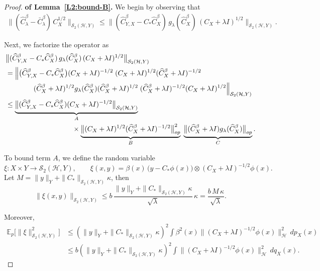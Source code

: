 \documentclass[twoside,11pt]{article}
\begin{document}
\begin{proof}\textbf{of Lemma~\ref{L2:bound-B}.}
We begin by observing that
\begin{align*}
\bigl\| ( \widehat{C}_\lambda^\beta-\bar{C}_{\lambda}^\beta)\, C_X^{1/2} \bigr\|_{\mathcal  S_2(\mathcal H,Y)}
\leq
\bigl\|
( \widehat{C}_{Y,X}^\beta-{C_*}\widehat C_X^\beta)\,
g_\lambda(\widehat{C}_X^\beta)\,
(C_{X}+\lambda I)^{1/2}
\bigr\|_{\mathcal S_2(\mathcal H,Y)} .
\end{align*}

\noindent
Next, we factorize the operator as
\begin{align*}
&\bigl\|
(\widehat{C}_{Y,X}^\beta - C_* \widehat{C}_X^\beta)\,
g_\lambda(\widehat{C}_X^\beta)\,
(C_X+\lambda I)^{1/2}
\bigr\|_{\mathcal S_2(\mathcal H,Y)} \\
&=
\Bigl\|
\bigl(\widehat{C}_{Y,X}^\beta - C_* \widehat{C}_X^\beta\bigr)
(C_X+\lambda I)^{-1/2}
\;
(C_X+\lambda I)^{1/2}
(\widehat{C}_X^\beta+\lambda I)^{-1/2} \\
&\qquad\qquad
(\widehat{C}_X^\beta+\lambda I)^{1/2}
g_\lambda(\widehat{C}_X^\beta)
(\widehat{C}_X^\beta+\lambda I)^{1/2}
\;
(\widehat{C}_X^\beta+\lambda I)^{-1/2}
(C_X+\lambda I)^{1/2}
\Bigr\|_{\mathcal S_2(\mathcal H,Y)} \\
&\le
\underbrace{\bigl\|
(\widehat{C}_{Y,X}^\beta - C_* \widehat{C}_X^\beta)
(C_X+\lambda I)^{-1/2}
\bigr\|_{\mathcal S_2(\mathcal H,Y)}}_{A}
\;\\
& \hspace{9.5em}  \times 
\underbrace{\bigl\|
(C_X+\lambda I)^{1/2}
(\widehat{C}_X^\beta+\lambda I)^{-1/2}
\bigr\|_{op}^2}_{B}
\; 
\underbrace{\bigl\|
(\widehat{C}_X^\beta+\lambda I)
g_\lambda(\widehat{C}_X^\beta)
\bigr\|_{op}}_{C}.
\end{align*}

\noindent
To bound term $A$, we define the random variable
\[
\xi : X \times Y \to \mathcal S_2(\mathcal H,Y), 
\qquad
\xi(x,y)
=
\beta(x)\,
\bigl(y-C_*\phi(x)\bigr)
\otimes
(C_X+\lambda I)^{-1/2}\phi(x).
\]
Let $M=\|y\|_Y+\|C_*\|_{\mathcal S_2(\mathcal H,Y)}\kappa$, then
\[
\|\xi(x,y)\|_{\mathcal S_2(\mathcal H,Y)}
\leq
b\,
\frac{\|y\|_Y+\|C_*\|_{\mathcal S_2(\mathcal H,Y)}\kappa}{\sqrt{\lambda}}
\,\kappa =
\frac{b\,M\,\kappa}{\sqrt{\lambda}}
 .
\]

\noindent
Moreover,
\begin{align*}
\mathbb{E}_p\bigl[\|\xi\|_{\mathcal S_2(\mathcal H,Y)}^2\bigr]
&\leq
(\|y\|_Y+\|C_*\|_{\mathcal S_2(\mathcal H,Y)}\kappa)^2
\int
\beta^2(x)
\bigl\|
(C_X+\lambda I)^{-1/2}\phi(x)
\bigr\|_{\mathcal H}^2
\,dp_X(x) \\
&\leq
b(\|y\|_Y+\|C_*\|_{\mathcal S_2(\mathcal H,Y)}\kappa)^2
\int
\bigl\|
(C_X+\lambda I)^{-1/2}\phi(x)
\bigr\|_{\mathcal H}^2
\,dq_X(x).
\end{align*}


\end{proof}
\end{document}

